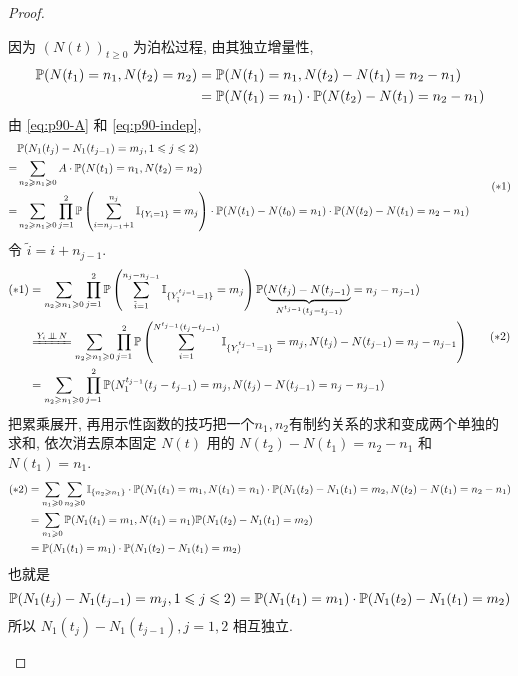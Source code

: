 \begin{proof}
\begin{enumerate}
        	因为 $(N(t))_{t\geq 0}$ 为泊松过程, 由其独立增量性,
        	\begin{equation}
        	\begin{aligned}
        	\mathbb{P}(N(t_1)=n_1,N(t_2)=n_2)&=
        	\mathbb{P}(N(t_1)=n_1,N(t_2)-N(t_1)=n_2-n_1)\\
        	&=\mathbb{P}(N(t_1)=n_1)\cdot \mathbb{P}(N(t_2)-N(t_1)=n_2-n_1)
        	\end{aligned}
        	\label{eq:p90-indep}
        	\end{equation}
由 \eqref{eq:p90-A} 和 \eqref{eq:p90-indep},
        \[
        \begin{aligned}
        &\mathbb{P}(N_1(t_j)-N_1(t_{j-1})=m_j,1\leqslant j\leqslant 2)\\
            =&\sum_{n_2\geqslant n_1\geqslant 0}A\cdot \mathbb{P}(N(t_1)=n_1,N(t_2)=n_2)\\
            =&\sum_{n_2\geqslant n_1\geqslant 0}\prod_{j=1}^2\mathbb{P}\left(\sum_{i=n_{j-1}+1}^{n_j}\mathbb I_{\{Y_i=1\}}=m_j\right)\cdot \mathbb{P}(N(t_1)-N(t_0)=n_1)\cdot \mathbb{P}(N(t_2)-N(t_1)=n_2-n_1)
				\end{aligned}
				\tag{$*1$}
				\]
				令 $\tilde{i}=i+n_{j-1}$.
				\[
				\begin{aligned}
            (*1)&=\sum_{n_2\geq n_1\geq 0}\prod_{j=1}^2\PP\left(\sum_{\tilde{i}=1}^{n_j-n_{j-1}}\II_{\{Y_{\tilde{i}}^{t_{j-1}}=1\}}=m_j\right)\PP(\underbrace{\displaystyle N(t_j)-N(t_{j-1})}_{N^{t_{j-1}}(t_j-t_{j-1})}=n_j-n_{j-1})\\
            &\xlongequal{Y_i\ind N}\sum_{n_2\geq n_1\geq 0}\prod_{j=1}^2 \PP\left(\sum_{i=1}^{N^{t_{j-1}}(t_j-t_{j-1})}\II_{\{Y_i^{t_{j-1}}=1\}}=m_j, N(t_j)-N(t_{j-1})=n_j-n_{j-1}\right)\\
            &=\sum_{n_2\geq n_1\geq 0}\prod_{j=1}^2 \PP(N_1^{t_{j-1}}(t_j-t_{j-1})=m_j, N(t_j)-N(t_{j-1})=n_j-n_{j-1})
            \end{aligned}
            \tag{$*2$}
            \]
            把累乘展开, 再用示性函数的技巧把一个$n_1,n_2$有制约关系的求和变成两个单独的求和, 依次消去原本固定 $N(t)$ 用的 $N(t_2)-N(t_1)=n_2-n_1$ 和 $N(t_1)=n_1$.
            \[
            \begin{aligned}
            (*2)&=\sum_{n_1\geqslant 0}\sum_{n_2\geqslant 0}\mathbb I_{\{n_2\geqslant n_1\}}\cdot \mathbb{P}(N_1(t_1)=m_1,N(t_1)=n_1)\cdot \mathbb{P}(N_1(t_2)-N_1(t_1)=m_2,N(t_2)-N(t_1)=n_2-n_1)\\
            &=\sum_{n_1\geqslant 0}\mathbb{P}(N_1(t_1)=m_1,N(t_1)=n_1)\mathbb{P}(N_1(t_2)-N_1(t_1)=m_2)\\
            &=\mathbb{P}(N_1(t_1)=m_1)\cdot \mathbb{P}(N_1(t_2)-N_1(t_1)=m_2)
        \end{aligned}
        \]
        也就是
        \[
        \mathbb{P}(N_1(t_j)-N_1(t_{j-1})=m_j,1\leqslant j\leqslant 2)=\mathbb{P}(N_1(t_1)=m_1)\cdot \mathbb{P}(N_1(t_2)-N_1(t_1)=m_2)
        \]
        所以 $N_1(t_j)-N_1(t_{j-1}),j=1,2$ 相互独立.
\end{enumerate}
\end{proof}

